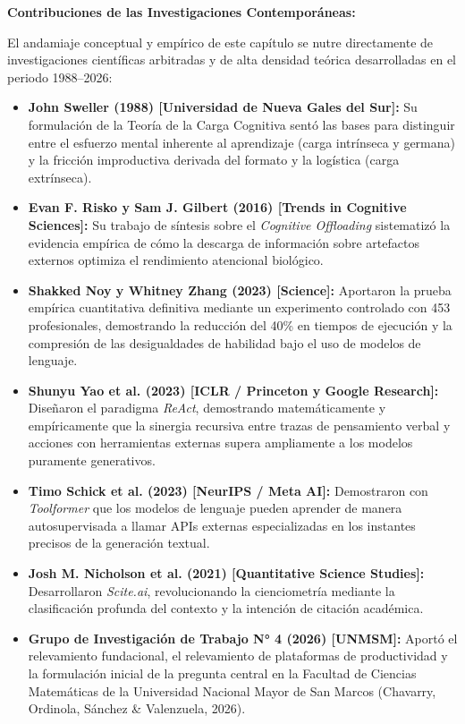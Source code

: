 \textbf{Contribuciones de las Investigaciones Contemporáneas:}\par\vspace{0.2cm}
El andamiaje conceptual y empírico de este capítulo se nutre directamente de investigaciones científicas arbitradas y de alta densidad teórica desarrolladas en el periodo 1988--2026:
\begin{itemize}
    \item \textbf{John Sweller (1988) [Universidad de Nueva Gales del Sur]:} Su formulación de la Teoría de la Carga Cognitiva sentó las bases para distinguir entre el esfuerzo mental inherente al aprendizaje (carga intrínseca y germana) y la fricción improductiva derivada del formato y la logística (carga extrínseca).
    \item \textbf{Evan F. Risko y Sam J. Gilbert (2016) [Trends in Cognitive Sciences]:} Su trabajo de síntesis sobre el \textit{Cognitive Offloading} sistematizó la evidencia empírica de cómo la descarga de información sobre artefactos externos optimiza el rendimiento atencional biológico.
    \item \textbf{Shakked Noy y Whitney Zhang (2023) [Science]:} Aportaron la prueba empírica cuantitativa definitiva mediante un experimento controlado con 453 profesionales, demostrando la reducción del 40\% en tiempos de ejecución y la compresión de las desigualdades de habilidad bajo el uso de modelos de lenguaje.
    \item \textbf{Shunyu Yao et al. (2023) [ICLR / Princeton y Google Research]:} Diseñaron el paradigma \textit{ReAct}, demostrando matemáticamente y empíricamente que la sinergia recursiva entre trazas de pensamiento verbal y acciones con herramientas externas supera ampliamente a los modelos puramente generativos.
    \item \textbf{Timo Schick et al. (2023) [NeurIPS / Meta AI]:} Demostraron con \textit{Toolformer} que los modelos de lenguaje pueden aprender de manera autosupervisada a llamar APIs externas especializadas en los instantes precisos de la generación textual.
    \item \textbf{Josh M. Nicholson et al. (2021) [Quantitative Science Studies]:} Desarrollaron \textit{Scite.ai}, revolucionando la cienciometría mediante la clasificación profunda del contexto y la intención de citación académica.
    \item \textbf{Grupo de Investigación de Trabajo N° 4 (2026) [UNMSM]:} Aportó el relevamiento fundacional, el relevamiento de plataformas de productividad y la formulación inicial de la pregunta central en la Facultad de Ciencias Matemáticas de la Universidad Nacional Mayor de San Marcos (Chavarry, Ordinola, Sánchez \& Valenzuela, 2026).
\end{itemize}
\vspace{0.3cm}

